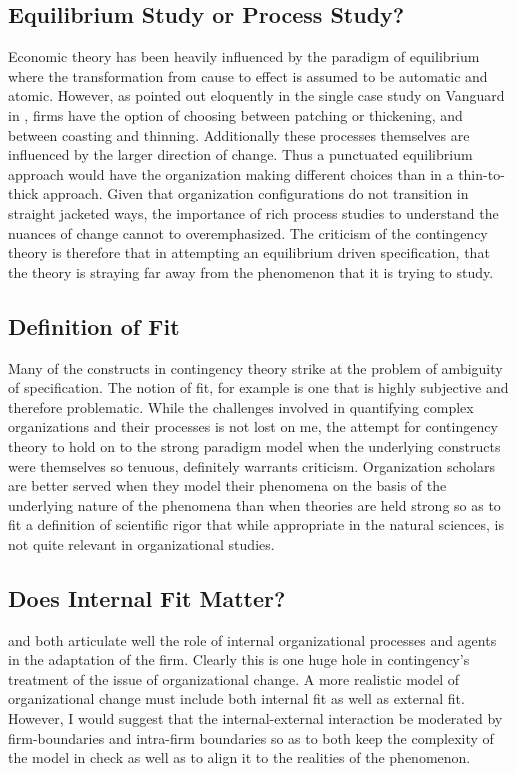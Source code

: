 \documentclass[12pt]{article}
\begin{document}
\subsection{Equilibrium Study or Process Study?}
Economic theory has been heavily influenced by the paradigm of equilibrium where the transformation from cause to effect is assumed to be automatic and atomic. However, as pointed out eloquently in the single case study on Vanguard in \cite{Siggelkow2002}, firms have the option of choosing between patching or thickening, and between coasting and thinning. Additionally these processes themselves are influenced by the larger direction of change. Thus a punctuated equilibrium approach would have the organization making different choices than in a thin-to-thick approach. Given that organization configurations do not transition in straight jacketed ways, the importance of rich process studies to understand the nuances of change cannot to overemphasized. The criticism of the contingency theory is therefore that in attempting an equilibrium driven specification, that the theory is straying far away from the phenomenon that it is trying to study.

\subsection{Definition of Fit}
Many of the constructs in contingency theory strike at the problem of ambiguity of specification. The notion of fit, for example is one that is highly subjective and therefore problematic. While the challenges involved in quantifying complex organizations and their processes is not lost on me, the attempt for contingency theory to hold on to the strong paradigm model when the underlying constructs were themselves so tenuous, definitely warrants criticism. Organization scholars are better served when they model their phenomena on the basis of the underlying nature of the phenomena than when theories are held strong so as to fit a  definition of scientific rigor that while appropriate in the natural sciences, is not quite relevant in organizational studies.


\subsection{Does Internal Fit Matter?}
\cite{Miller1992} and \cite{Smith2011} both articulate well the role of internal organizational processes and agents in the adaptation of the firm. Clearly this is one huge hole in contingency's treatment of the issue of organizational change. A more realistic model of organizational change must include both internal fit as well as external fit. However, I would suggest that the internal-external interaction be moderated by firm-boundaries and intra-firm boundaries so as to both keep the complexity of the model in check as well as to align it to the realities of the phenomenon.
\end{document}
